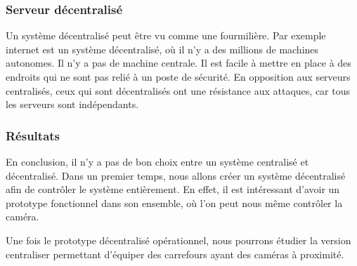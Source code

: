 \subsubsection{Serveur décentralisé}
\label{sec:centralise_decentralise}
Un système décentralisé peut être vu comme une fourmilière. Par exemple internet est un système décentralisé, où il n'y a des millions de machines autonomes. Il n'y a pas de machine centrale.
Il est facile à mettre en place à des endroits qui ne sont pas relié à un poste de sécurité.
En opposition aux serveurs centralisés, ceux qui sont décentralisés ont une résistance aux attaques, car tous les serveurs sont indépendants.

\subsubsection{Résultats}
\label{sec:centralise_resultat}
En conclusion, il n'y a pas de bon choix entre un système centralisé et décentralisé.
Dans un premier temps, nous allons créer un système décentralisé afin de contrôler le système entièrement. En effet, il est intéressant
d'avoir un prototype fonctionnel dans son ensemble, où l'on peut nous même contrôler la caméra.

Une fois le prototype décentralisé opérationnel, nous pourrons étudier la version centraliser permettant d'équiper des carrefours ayant des caméras à proximité.
